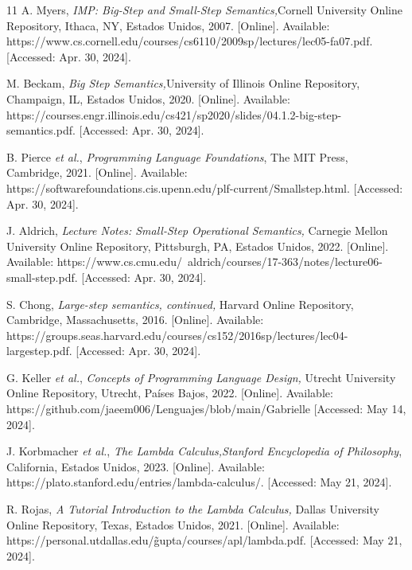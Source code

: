 \begin{thebibliography}{11}
    \label{sec:102}
    \hypertarget{102}{}
    A. Myers, \textit{IMP: Big-Step and Small-Step Semantics,}Cornell University Online Repository, Ithaca, NY, Estados Unidos, 2007. [Online]. Available: https://www.cs.cornell.edu/courses/cs6110/2009sp/lectures/lec05-fa07.pdf. [Accessed: Apr. 30, 2024].

    \label{sec:103}
    \hypertarget{103}{}
    M. Beckam, \textit{Big Step Semantics,}University of Illinois Online Repository, Champaign, IL, Estados Unidos, 2020. [Online]. Available: https://courses.engr.illinois.edu/cs421/sp2020/slides/04.1.2-big-step-semantics.pdf. [Accessed: Apr. 30, 2024].

    \label{sec:104}
    \hypertarget{104}{}
    B. Pierce \textit{et al.}, \textit{Programming Language Foundations}, The MIT Press,  Cambridge, 2021. [Online]. Available: https://softwarefoundations.cis.upenn.edu/plf-current/Smallstep.html. [Accessed: Apr. 30, 2024].

    \label{sec:105}
    \hypertarget{105}{}
    J. Aldrich, \textit{Lecture Notes: Small-Step Operational Semantics, } Carnegie Mellon University Online Repository, Pittsburgh, PA, Estados Unidos, 2022. [Online]. Available: https://www.cs.cmu.edu/~aldrich/courses/17-363/notes/lecture06-small-step.pdf. [Accessed: Apr. 30, 2024].

    \label{sec:106}
    \hypertarget{106}{}
    S. Chong, \textit{Large-step semantics, continued, }Harvard Online Repository, Cambridge, Massachusetts, 2016. [Online]. Available: https://groups.seas.harvard.edu/courses/cs152/2016sp/lectures/lec04-largestep.pdf. [Accessed: Apr. 30, 2024].

    \label{sec:107}
    \hypertarget{107}{}
    G. Keller \textit{et al.}, \textit{Concepts of Programming Language Design, }Utrecht University Online Repository, Utrecht, Países Bajos, 2022. [Online]. Available: https://github.com/jaeem006/Lenguajes/blob/main/Gabrielle [Accessed: May 14, 2024].

    \label{sec:108}
    \hypertarget{108}{}
    J. Korbmacher \textit{et al.}, \textit{The Lambda Calculus,}\textit{Stanford Encyclopedia of Philosophy}, California, Estados Unidos, 2023. [Online]. Available: https://plato.stanford.edu/entries/lambda-calculus/. [Accessed: May 21, 2024].

    \label{sec:109}
    \hypertarget{109}{}
    R. Rojas, \textit{A Tutorial Introduction to the Lambda Calculus, }Dallas University Online Repository, Texas, Estados Unidos, 2021. [Online]. Available: https://personal.utdallas.edu/\~gupta/courses/apl/lambda.pdf. [Accessed: May 21, 2024].


\end{thebibliography}
